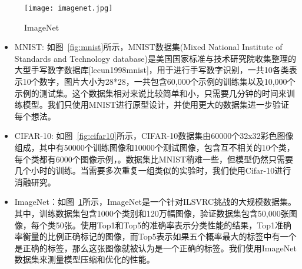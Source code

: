 \begin{figure}[]
    \centering
    \texttt{[image: imagenet.jpg]}	%
    \caption{ImageNet}
    \label{fig:imagenet} %
\end{figure}

\begin{itemize}
    \item MNIST: 如图~\ref{fig:mnist}所示，MNIST数据集(Mixed National Institute of Standards and Technology database)是美国国家标准与技术研究院收集整理的大型手写数字数据库[lecun1998mnist]，用于进行手写数字识别，一共10各类表示10个数字，图片大小为28*28，一共包含60,000个示例的训练集以及10,000个示例的测试集。这个数据集相对来说比较简单和小，只需要几分钟的时间来训练模型。我们只使用MNIST进行原型设计，并使用更大的数据集进一步验证每个想法。
    \item CIFAR-10: 如图~\ref{fig:cifar10}所示，CIFAR-10数据集由60000个32x32彩色图像组成，其中有50000个训练图像和10000个测试图像，包含互不相关的10个类\cite{krizhevsky2009learning}，每个类都有6000个图像示例，。数据集比MNIST稍难一些，但模型仍然只需要几个小时的训练。当需要多次重复一组类似的实验时，我们使用Cifar-10进行消融研究。
    \item ImageNet：如图~\ref{fig:imagenet}所示，ImageNet是一个针对ILSVRC挑战的大规模数据集\cite{krizhevsky2012imagenet}。其中，训练数据集包含1000个类别和120万幅图像，验证数据集包含50,000张图像，每个类50张。使用Top1和Top5的准确率表示分类性能的结果，Top1准确率衡量的比例正确标记的图像，而Top5表示如果五个概率最大的标签中有一个是正确的标签，那么这张图像就被认为是一个正确的标签。我们使用ImageNet数据集来测量模型压缩和优化的性能。
\end{itemize}

